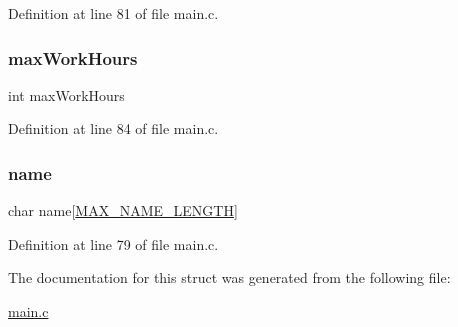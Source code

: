 Definition at line 81 of file main.\+c.

\hypertarget{structteacher_a3f74b78dd29a3ee2e03f00567ea9b333}{}\label{structteacher_a3f74b78dd29a3ee2e03f00567ea9b333} 
\subsubsection{\texorpdfstring{max\+Work\+Hours}{maxWorkHours}}
{\footnotesize\ttfamily int max\+Work\+Hours}



Definition at line 84 of file main.\+c.

\hypertarget{structteacher_ad50982abf9e9bbbc784f8f17fa25b1b2}{}\label{structteacher_ad50982abf9e9bbbc784f8f17fa25b1b2} 
\subsubsection{\texorpdfstring{name}{name}}
{\footnotesize\ttfamily char name\mbox{[}\hyperlink{main_8c_a0c397a708cec89c74029582574516b30}{M\+A\+X\+\_\+\+N\+A\+M\+E\+\_\+\+L\+E\+N\+G\+TH}\mbox{]}}



Definition at line 79 of file main.\+c.



The documentation for this struct was generated from the following file\+:\begin{DoxyCompactItemize}
\item 
\hyperlink{main_8c}{main.\+c}\end{DoxyCompactItemize}
